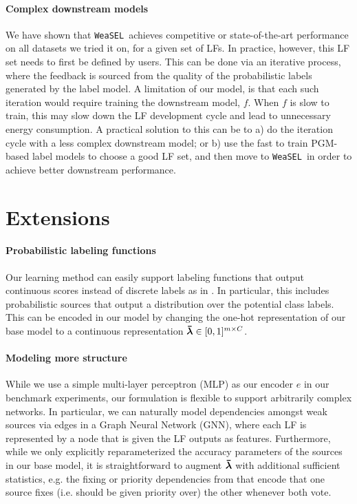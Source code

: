 \documentclass{article}
\newcommand{\weasel}{\texttt{WeaSEL}}\newcommand{\brackets}[1]{\left( #1 \right)}
\newcommand{\lambdaOnehot}{\accentset{\rule{.4em}{.8pt}}{\lfs}}
\begin{document}
\paragraph{Complex downstream models}
We have shown that \weasel\ achieves competitive or state-of-the-art performance on all datasets we tried it on, for a given set of LFs. In practice, however, this LF set needs to first be defined by users. This can be done via an iterative process, where the feedback is sourced from the quality of the probabilistic labels generated by the label model. A limitation of our model, is that each such iteration would require training the downstream model, $f$. When $f$ is slow to train, this may slow down the LF development cycle and lead to unnecessary energy consumption. A practical solution to this can be to a) do the iteration cycle with a less complex downstream model; or b) use the fast to train PGM-based label models to choose a good LF set, and then move to \weasel\ in order to achieve better downstream performance. 
\section{Extensions}
\label{Extension}
\paragraph{Probabilistic labeling functions}
Our learning method can easily support labeling functions that output continuous scores instead of discrete labels as in \cite{chatterjee2019data}. In particular, this includes probabilistic sources that output a distribution over the potential class labels.
This can be encoded in our model by changing the one-hot representation of our base model to a continuous representation $\lambdaOnehot \in [0, 1]^{m \times C}$.

\paragraph{Modeling more structure}
While we use a simple multi-layer perceptron (MLP) as our encoder $e$ in our benchmark experiments, our formulation is flexible to support arbitrarily complex networks. In particular, we can naturally model dependencies amongst weak sources via edges in a Graph Neural Network (GNN), where each LF is represented by a node that is given the LF outputs as features.
Furthermore, while  we only explicitly reparameterized  the accuracy parameters of the sources in our base model, it is straightforward to augment $\lambdaOnehot$ with additional sufficient statistics, e.g. the fixing or priority dependencies from \cite{DP, MisspecificationInDP} that encode that one source fixes (i.e. should be given priority over) the other whenever both vote.
 
\end{document}
